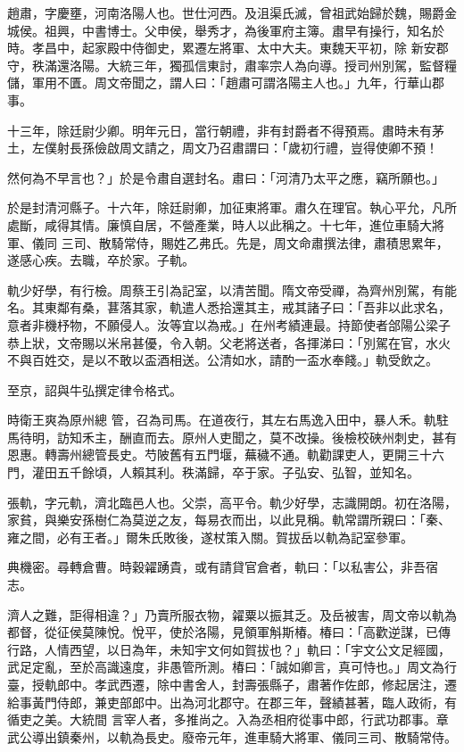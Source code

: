 \begin{pinyinscope}
 趙肅，字慶壅，河南洛陽人也。世仕河西。及沮渠氏滅，曾祖武始歸於魏，賜爵金城侯。祖興，中書博士。父申侯，舉秀才，為後軍府主簿。肅早有操行，知名於時。孝昌中，起家殿中侍御史，累遷左將軍、太中大夫。東魏天平初，除
 新安郡守，秩滿還洛陽。大統三年，獨孤信東討，肅率宗人為向導。授司州別駕，監督糧儲，軍用不匱。周文帝聞之，謂人曰：「趙肅可謂洛陽主人也。」九年，行華山郡事。



 十三年，除廷尉少卿。明年元日，當行朝禮，非有封爵者不得預焉。肅時未有茅土，左僕射長孫儉啟周文請之，周文乃召肅謂曰：「歲初行禮，豈得使卿不預！



 然何為不早言也？」於是令肅自選封名。肅曰：「河清乃太平之應，竊所願也。」



 於是封清河縣子。十六年，除廷尉卿，加征東將軍。肅久在理官。執心平允，凡所處斷，咸得其情。廉慎自居，不營產業，時人以此稱之。十七年，進位車騎大將軍、儀同
 三司、散騎常侍，賜姓乙弗氏。先是，周文命肅撰法律，肅積思累年，遂感心疾。去職，卒於家。子軌。



 軌少好學，有行檢。周蔡王引為記室，以清苦聞。隋文帝受禪，為齊州別駕，有能名。其東鄰有桑，葚落其家，軌遣人悉拾還其主，戒其諸子曰：「吾非以此求名，意者非機杼物，不願侵人。汝等宜以為戒。」在州考績連最。持節使者郃陽公梁子恭上狀，文帝賜以米帛甚優，令入朝。父老將送者，各揮涕曰：「別駕在官，水火不與百姓交，是以不敢以盃酒相送。公清如水，請酌一盃水奉餞。」軌受飲之。



 至京，詔與牛弘撰定律令格式。



 時衛王爽為原州總
 管，召為司馬。在道夜行，其左右馬逸入田中，暴人禾。軌駐馬待明，訪知禾主，酬直而去。原州人吏聞之，莫不改操。後檢校硤州刺史，甚有恩惠。轉壽州總管長史。芍陂舊有五門堰，蕪穢不通。軌勸課吏人，更開三十六門，灌田五千餘頃，人賴其利。秩滿歸，卒于家。子弘安、弘智，並知名。



 張軌，字元軌，濟北臨邑人也。父崇，高平令。軌少好學，志識開朗。初在洛陽，家貧，與樂安孫樹仁為莫逆之友，每易衣而出，以此見稱。軌常謂所親曰：「秦、雍之間，必有王者。」爾朱氏敗後，遂杖策入關。賀拔岳以軌為記室參軍。



 典機密。尋轉倉曹。時穀糴踴貴，或有請貸官倉者，軌曰：「以私害公，非吾宿志。



 濟人之難，詎得相違？」乃賣所服衣物，糴粟以振其乏。及岳被害，周文帝以軌為都督，從征侯莫陳悅。悅平，使於洛陽，見領軍斛斯椿。椿曰：「高歡逆謀，已傳行路，人情西望，以日為年，未知宇文何如賀拔也？」軌曰：「宇文公文足經國，武足定亂，至於高識遠度，非愚管所測。椿曰：「誠如卿言，真可恃也。」周文為行臺，授軌郎中。孝武西遷，除中書舍人，封壽張縣子，肅著作佐郎，修起居注，遷給事黃門侍郎，兼吏部郎中。出為河北郡守。在郡三年，聲績甚著，臨人政術，有循吏之美。大統間
 言宰人者，多推尚之。入為丞相府從事中郎，行武功郡事。章武公導出鎮秦州，以軌為長史。廢帝元年，進車騎大將軍、儀同三司、散騎常侍。




\end{pinyinscope}
